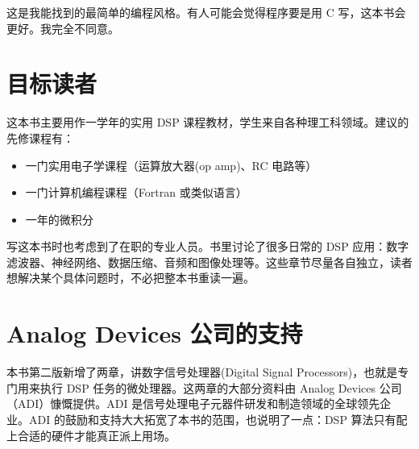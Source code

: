 这是我能找到的最简单的编程风格。有人可能会觉得程序要是用 C
写，这本书会更好。我完全不同意。

\section{目标读者}

这本书主要用作一学年的实用 DSP
课程教材，学生来自各种理工科领域。建议的先修课程有：

\begin{itemize}
\tightlist
\item
  一门实用电子学课程（运算放大器(op amp)、RC 电路等）
\item
  一门计算机编程课程（Fortran 或类似语言）
\item
  一年的微积分
\end{itemize}

写这本书时也考虑到了在职的专业人员。书里讨论了很多日常的 DSP
应用：数字滤波器、神经网络、数据压缩、音频和图像处理等。这些章节尽量各自独立，读者想解决某个具体问题时，不必把整本书重读一遍。

\section{Analog Devices 公司的支持}

本书第二版新增了两章，讲数字信号处理器(Digital Signal
Processors)，也就是专门用来执行 DSP 任务的微处理器。这两章的大部分资料由
Analog Devices 公司（ADI）慷慨提供。ADI
是信号处理电子元器件研发和制造领域的全球领先企业。ADI
的鼓励和支持大大拓宽了本书的范围，也说明了一点：DSP
算法只有配上合适的硬件才能真正派上用场。
